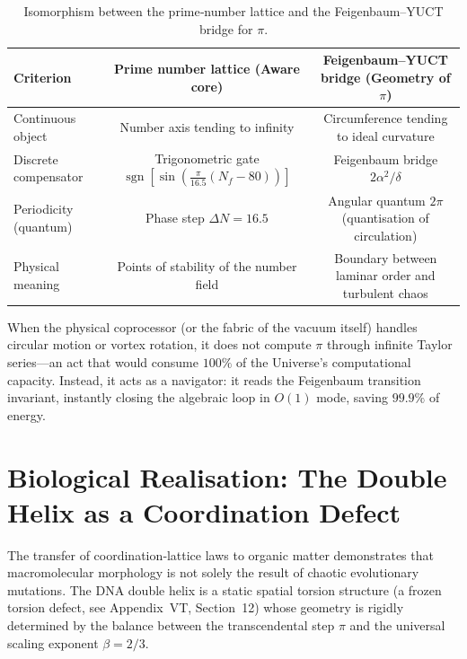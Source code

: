 \documentclass[12pt,a4paper]{article}
\begin{document}
	\begin{table}[H]
		\centering
		\scriptsize
		\caption{Isomorphism between the prime‑number lattice and the Feigenbaum–YUCT bridge for $\pi$.}
		\label{tab:isomorphism}
		\begin{tabular}{@{}lcc@{}}
			\toprule
			\textbf{Criterion} & \textbf{Prime number lattice (Aware core)} & \textbf{Feigenbaum–YUCT bridge (Geometry of $\pi$)} \\
			\midrule
			Continuous object & Number axis tending to infinity & Circumference tending to ideal curvature \\
			Discrete compensator & Trigonometric gate $\operatorname{sgn}[\sin(\frac{\pi}{16.5}(N_f-80))]$ & Feigenbaum bridge $2\alpha^2/\delta$ \\
			Periodicity (quantum) & Phase step $\Delta N = 16.5$ & Angular quantum $2\pi$ (quantisation of circulation) \\
			Physical meaning & Points of stability of the number field & Boundary between laminar order and turbulent chaos \\
			\bottomrule
		\end{tabular}
	\end{table}
	
	When the physical coprocessor (or the fabric of the vacuum itself) handles circular motion or vortex rotation, it does not compute $\pi$ through infinite Taylor series—an act that would consume $100\%$ of the Universe's computational capacity. Instead, it acts as a navigator: it reads the Feigenbaum transition invariant, instantly closing the algebraic loop in $O(1)$ mode, saving $99.9\%$ of energy.
	
	\section{Biological Realisation: The Double Helix as a Coordination Defect}
	\label{sec:dna}
	
	The transfer of coordination‑lattice laws to organic matter demonstrates that macromolecular morphology is not solely the result of chaotic evolutionary mutations. The DNA double helix is a static spatial torsion structure (a frozen torsion defect, see Appendix~VT, Section~12) whose geometry is rigidly determined by the balance between the transcendental step \(\pi\) and the universal scaling exponent \(\beta = 2/3\).
	
\end{document}
